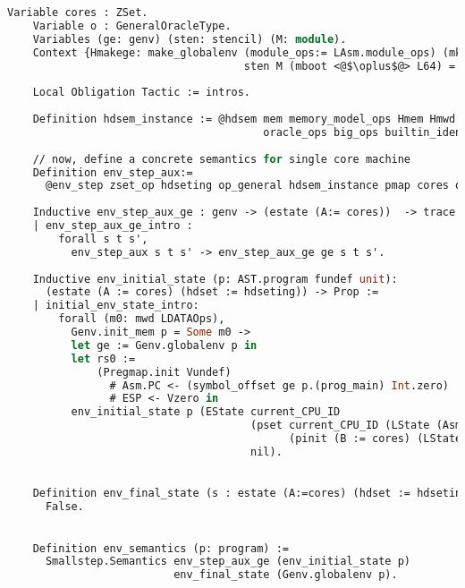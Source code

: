 \begin{lstlisting}[language=Caml]
    Variable cores : ZSet.
    Variable o : GeneralOracleType.
    Variables (ge: genv) (sten: stencil) (M: module).
    Context {Hmakege: make_globalenv (module_ops:= LAsm.module_ops) (mkp_ops:= make_program_ops) 
                                     sten M (mboot <@$\oplus$@> L64) = ret ge}.
    
    Local Obligation Tactic := intros.
    
    Definition hdsem_instance := @hdsem mem memory_model_ops Hmem Hmwd real_params_ops oracle_ops0
                                        oracle_ops big_ops builtin_idents_norepet_prf ge sten M Hmakege.
    
    // now, define a concrete semantics for single core machine 
    Definition env_step_aux:=
      @env_step zset_op hdseting op_general hdsem_instance pmap cores o.
    
    Inductive env_step_aux_ge : genv -> (estate (A:= cores))  -> trace -> (estate (A:= cores)) -> Prop :=
    | env_step_aux_ge_intro : 
        forall s t s',
          env_step_aux s t s' -> env_step_aux_ge ge s t s'.
    
    Inductive env_initial_state (p: AST.program fundef unit): 
      (estate (A := cores) (hdset := hdseting)) -> Prop :=
    | initial_env_state_intro: 
        forall (m0: mwd LDATAOps),
          Genv.init_mem p = Some m0 ->
          let ge := Genv.globalenv p in
          let rs0 :=
              (Pregmap.init Vundef)
                # Asm.PC <- (symbol_offset ge p.(prog_main) Int.zero)
                # ESP <- Vzero in
          env_initial_state p (EState current_CPU_ID 
                                      (pset current_CPU_ID (LState (Asm.State rs0 m0) true)
                                            (pinit (B := cores) (LState (Asm.State rs0 m0) false)))
                                      nil).
    

    Definition env_final_state (s : estate (A:=cores) (hdset := hdseting)) (i : int) : Prop :=
      False.
      

    Definition env_semantics (p: program) :=
      Smallstep.Semantics env_step_aux_ge (env_initial_state p) 
                          env_final_state (Genv.globalenv p).
    
\end{lstlisting}



